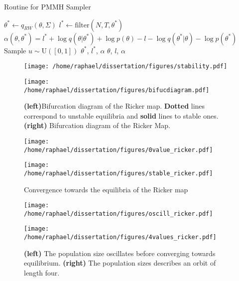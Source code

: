 \documentclass{article}
\begin{document}
	\begin{algorithm}
		\caption{Routine for PMMH Sampler}\label{routine}
		\begin{algorithmic}[1]
			\State $\theta^* \gets q_{RW}(\theta, \Sigma)$
			\State $l^* \gets \text{filter}(N, T, \theta^*)$
			\State $\alpha(\theta, \theta^*) = l^*+\log q(\theta|\theta^*) + \log p(\theta) - l - \log q(\theta^*|\theta) - \log p(\theta^*)$
			\State Sample $u \sim \text{U}([0, 1])$
			\State \Return $\theta^*$, $l^*$, $\alpha$
			\Else
			\State \Return $\theta$, $l$, $\alpha$
			\EndIf
			\EndFunction
		\end{algorithmic}
	\end{algorithm}
	
	
	\begin{figure}[htb]
		\centering
		\begin{minipage}{0.4\textwidth}
			\centering
			\texttt{[image: /home/raphael/dissertation/figures/stability.pdf]}
		\end{minipage}
		\begin{minipage}{0.4\textwidth}
			\centering
			\texttt{[image: /home/raphael/dissertation/figures/bifucdiagram.pdf]}
		\end{minipage}
		\caption{\textbf{(left)}Bifurcation diagram of the Ricker map. \textbf{Dotted} lines correspond to unstable equilibria and \textbf{solid} lines to stable ones. \textbf{(right)} Bifurcation diagram of the Ricker Map.}
		\label{fig:stability}
	\end{figure}

	\begin{figure}[htb]
		\centering
		\begin{minipage}{0.4\textwidth}
			\centering
			\texttt{[image: /home/raphael/dissertation/figures/0value\_ricker.pdf]}
		\end{minipage}
		\begin{minipage}{0.4\textwidth}
			\centering
			\texttt{[image: /home/raphael/dissertation/figures/stable\_ricker.pdf]}
		\end{minipage}
		\caption{Convergence towards the equilibria of the Ricker map}
		\label{fig:stab}
	\end{figure}

	\begin{figure}[htb]
		\centering
		\begin{minipage}{0.4\textwidth}
			\centering
			\texttt{[image: /home/raphael/dissertation/figures/oscill\_ricker.pdf]}
		\end{minipage}
		\begin{minipage}{0.4\textwidth}
			\centering
			\texttt{[image: /home/raphael/dissertation/figures/4values\_ricker.pdf]}
		\end{minipage}
		\caption{\textbf{(left)} The population size oscillates before converging towards equilibrium. \textbf{(right)} The population sizes describes an orbit of length four.}
		\label{fig:oscill}
	\end{figure}
	
\end{document}
